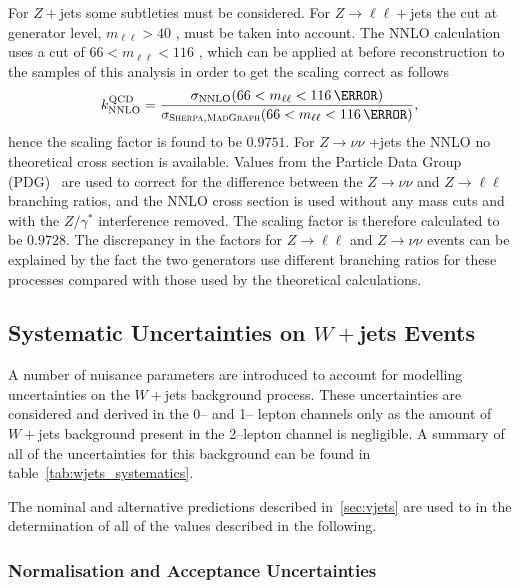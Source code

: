 For $Z+$jets some subtleties must be considered. For $Z\to\ell\ell +$jets the
cut at generator level, $m_{\ell\ell}>40$ \GeV, must be taken into account. The
NNLO calculation uses a cut of $66<m_{\ell\ell}<116$ \GeV, which can be applied
at before reconstruction to the samples of this analysis in order to get the
scaling correct as follows
\begin{equation}
  k_{\text{NNLO}}^{\text{QCD}} =
  \frac{\sigma_{\text{NNLO}}(66<m_{\ell\ell}<116\,{\GeV})}%
  {\sigma_{\textsc{Sherpa},\textsc{MadGraph}}(66<m_{\ell\ell}<116\,{\GeV})},
  \label{eq:nnlo-vjets-k}
\end{equation}
hence the scaling factor is found to be $0.9751$. For $Z \to \nu\nu$ +jets the
NNLO no theoretical cross section is available. Values from the
Particle Data Group (PDG)~\cite{PDG} are used to correct for the difference
between the $Z \to \nu\nu$ and $Z \to \ell\ell$ branching ratios, and the NNLO
cross section is used without any mass cuts and with the $Z/\gamma^*$
interference removed. The scaling factor is therefore calculated to be $0.9728$.
The discrepancy in the factors for $Z\to\ell\ell$ and $Z\to\nu\nu$ events can be
explained by the fact the two generators use different branching ratios for
these processes compared with those used by the theoretical calculations.

\subsection{Systematic Uncertainties on $W+$jets Events}
A number of nuisance parameters are introduced to account for modelling
uncertainties on the $W+$jets background process. These uncertainties are
considered and derived in the 0-- and 1-- lepton channels only as the amount of
$W+$jets background present in the 2--lepton channel is negligible. A summary of
all of the uncertainties for this background can be found in
table~\ref{tab:wjets_systematics}.

The nominal and alternative predictions described in~\ref{sec:vjets} are used to
in the determination of all of the values described in the following. 

\subsubsection{Normalisation and Acceptance Uncertainties}

